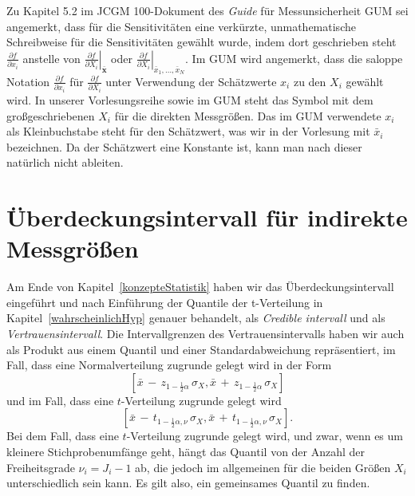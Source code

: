 Zu Kapitel 5.2 im JCGM 100-Dokument des \textsl{Guide} für Messunsicherheit GUM
sei angemerkt, dass für die Sensitivitäten eine verkürzte, unmathematische Schreibweise
für die Sensitivitäten gewählt wurde, indem dort geschrieben steht $\frac{\partial f}{\partial x_i}$
anstelle von $\left. \frac{\partial f}{\partial X_i} \right|_{\bar{\mathbf{x}}}$ oder
$\left. \frac{\partial f}{\partial X_i} \right|_{\bar x_1, \dots, \bar x_N}$.
Im GUM wird angemerkt, dass die saloppe Notation $\frac{\partial f}{\partial x_i}$ für
$\frac{\partial f}{\partial X_i}$
unter Verwendung der Schätzwerte $x_i$ zu den $X_i$ gewählt wird.
In unserer Vorlesungsreihe sowie im GUM steht das Symbol mit dem großgeschriebenen $X_i$ für die
direkten Messgrößen. Das im GUM verwendete $x_i$ als Kleinbuchstabe steht für den Schätzwert,
was wir in der Vorlesung mit $\bar x_i$ bezeichnen. Da der Schätzwert eine Konstante ist,
kann man nach dieser natürlich nicht ableiten.


\section{Überdeckungsintervall für indirekte Messgrößen}

Am Ende von Kapitel~\ref{konzepteStatistik} haben wir das Überdeckungsintervall eingeführt
und nach Einführung der Quantile der t-Verteilung in Kapitel~\ref{wahrscheinlichHyp} genauer
behandelt, als \textsl{Credible intervall} und als \textsl{Vertrauensintervall}.
Die Intervallgrenzen des Vertrauensintervalls haben wir
auch als Produkt aus einem Quantil und einer Standardabweichung repräsentiert, im Fall, dass
eine Normalverteilung zugrunde gelegt wird in der Form
\begin{equation}
\left[\bar x \, - \, z_{1-\frac{1}{2}\alpha} \, \sigma_X,
\bar x \, + \, z_{1-\frac{1}{2}\alpha} \, \sigma_X \right]
\end{equation}
und im Fall, dass eine $t$-Verteilung zugrunde gelegt wird
\begin{equation}
\left[\bar x \, - \, t_{1-\frac{1}{2}\alpha, \nu} \, \sigma_X,
\bar x \, + \, t_{1-\frac{1}{2}\alpha, \nu} \, \sigma_X \right] .
\end{equation}
Bei dem Fall, dass eine $t$-Verteilung zugrunde gelegt wird, und zwar, wenn es um kleinere
Stichprobenumfänge geht, hängt das Quantil von der Anzahl der Freiheitsgrade $\nu_i = J_i - 1$
ab, die jedoch im allgemeinen für die beiden Größen $X_i$
unterschiedlich sein kann. Es gilt also, ein gemeinsames Quantil zu finden.

